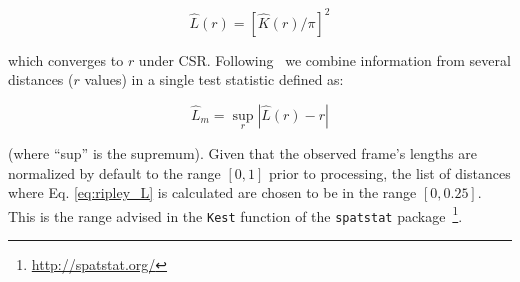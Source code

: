 \documentclass{aa}
\begin{document}



 \begin{equation}
 \hat{L}(r) = [\hat{K}(r)/\pi]^2
 \end{equation}

 \noindent which converges to $r$ under CSR. Following~\cite{Dixon_2014} we
 combine information from several distances ($r$ values) in a single test
 statistic defined as:

 \begin{equation}
 \hat{L}_{m} = \sup_{r} |\hat{L}(r) - r|
 \label{eq:ripley_L}
 \end{equation}

 \noindent (where ``sup'' is the supremum).
 Given that the observed frame's lengths are normalized by default to the
 range $[0,1]$ prior to processing, the list of distances where Eq.
 \ref{eq:ripley_L} is calculated are chosen to be in the range $[0, 0.25]$.
 This is the range advised in the \texttt{Kest} function of the
 \texttt{spatstat}
 package~\citep{Baddeley_2015}\footnote{\url{http://spatstat.org/}}.
\end{document}
